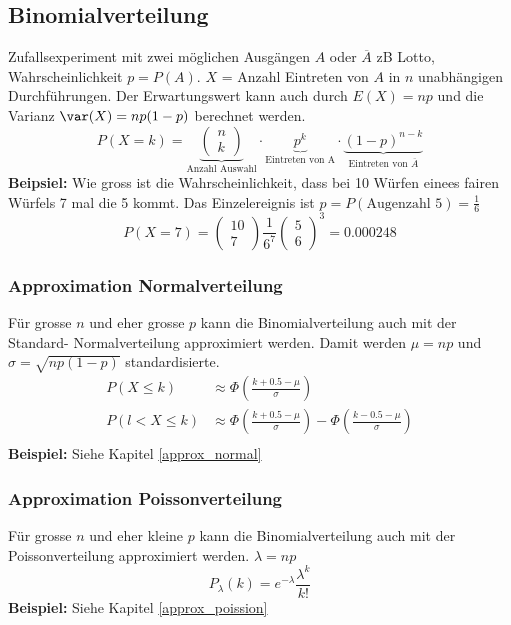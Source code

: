 \subsection{Binomialverteilung}
Zufallsexperiment mit zwei möglichen Ausgängen $A$ oder $\overline{A}$ zB Lotto, Wahrscheinlichkeit $p = P(A)$. $X$ = Anzahl Eintreten von $A$ in $n$ unabhängigen Durchführungen. Der Erwartungswert kann auch durch $E(X) = np$ und die Varianz $\var(X) = np(1 - p)$ berechnet werden.
\[
P(X = k) = \underbrace{\begin{pmatrix}	n \\ k \end{pmatrix}}_{\text{Anzahl Auswahl}}\cdot \underbrace{p^k}_{\text{Eintreten von A}}\cdot\underbrace{(1-p)^{n-k}}_{\text{Eintreten von }\overline{A
}}
\]
\noindent\textbf{Beipsiel:} Wie gross ist die Wahrscheinlichkeit, dass bei 10 Würfen einees fairen Würfels 7 mal die 5 kommt. Das Einzelereignis ist $p = P(\text{Augenzahl } 5) = \frac{1}{6}$
\[
P (X = 7) = \begin{pmatrix}	10 \\ 7 \end{pmatrix} \frac{1}{6^7}\begin{pmatrix}	5 \\ 6 \end{pmatrix}^3 = 0.000248
\]
\subsubsection{Approximation Normalverteilung}
Für grosse $n$ und eher grosse $p$ kann die Binomialverteilung auch mit der Standard- Normalverteilung approximiert werden. Damit werden $\mu = np$ und $\sigma = \sqrt{np(1-p)}$ standardisierte. 
\begin{align*}
	P(X \leq k) &\approx \Phi(\frac{k + 0.5 - \mu}{\sigma}) \\
	P(l < X \leq k) &\approx \Phi(\frac{k + 0.5 - \mu}{\sigma})  - \Phi(\frac{k - 0.5 - \mu}{\sigma}) \\
\end{align*}
\noindent\textbf{Beispiel:} Siehe Kapitel \ref{approx_normal}

\subsubsection{Approximation Poissonverteilung}
Für grosse $n$ und eher kleine $p$ kann die Binomialverteilung auch mit der Poissonverteilung approximiert werden. $\lambda = np$
\[
P_\lambda(k) = e^{-\lambda}\frac{\lambda^k}{k!}
\]
\noindent\textbf{Beispiel:} Siehe Kapitel \ref{approx_poission}


